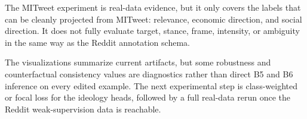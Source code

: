 \documentclass[11pt,twocolumn]{article}
\begin{document}
The MITweet experiment is real-data evidence, but it only covers the labels that can be cleanly projected from MITweet: relevance, economic direction, and social direction. It does not fully evaluate target, stance, frame, intensity, or ambiguity in the same way as the Reddit annotation schema.

The visualizations summarize current artifacts, but some robustness and counterfactual consistency values are diagnostics rather than direct B5 and B6 inference on every edited example. The next experimental step is class-weighted or focal loss for the ideology heads, followed by a full real-data rerun once the Reddit weak-supervision data is reachable.



\end{document}
